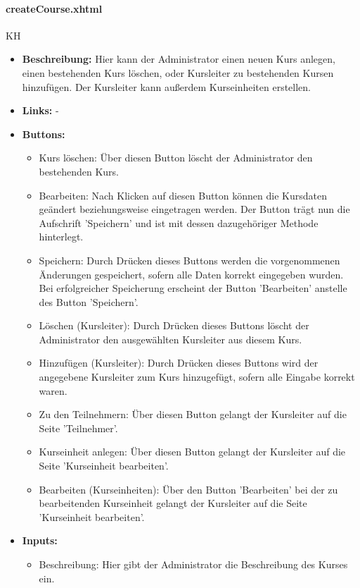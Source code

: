 				\paragraph{createCourse.xhtml}
					KH\\
					\begin{itemize}
						\item \textbf{Beschreibung:} Hier kann der Administrator einen neuen Kurs anlegen, einen bestehenden Kurs löschen, oder Kursleiter zu bestehenden Kursen hinzufügen. Der Kursleiter kann außerdem Kurseinheiten erstellen.
						\item \textbf{Links:} -
						\item \textbf{Buttons:}
							\begin{itemize}
								\item Kurs löschen: Über diesen Button löscht der Administrator den bestehenden Kurs.
								\item Bearbeiten: Nach Klicken auf diesen Button können die Kursdaten geändert beziehungsweise eingetragen werden. Der Button trägt nun die Aufschrift 'Speichern' und ist mit dessen dazugehöriger Methode hinterlegt.
								\item Speichern:  Durch Drücken dieses Buttons werden die vorgenommenen Änderungen gespeichert, sofern alle Daten korrekt eingegeben wurden. Bei erfolgreicher Speicherung erscheint der Button 'Bearbeiten' anstelle des Button 'Speichern'.
								\item Löschen (Kursleiter): Durch Drücken dieses Buttons löscht der Administrator den ausgewählten Kursleiter aus diesem Kurs. 
								\item Hinzufügen (Kursleiter): Durch Drücken dieses Buttons wird der angegebene Kursleiter zum Kurs hinzugefügt, sofern alle Eingabe korrekt waren.
								\item Zu den Teilnehmern: Über diesen Button gelangt der Kursleiter auf die Seite 'Teilnehmer'.
								\item Kurseinheit anlegen: Über diesen Button gelangt der Kursleiter auf die Seite 'Kurseinheit bearbeiten'.
								\item Bearbeiten (Kurseinheiten): Über den Button 'Bearbeiten' bei der zu bearbeitenden Kurseinheit gelangt der Kursleiter auf die Seite 'Kurseinheit bearbeiten'.
							\end{itemize}
						\item \textbf{Inputs:}
							\begin{itemize}
								\item Beschreibung: Hier gibt der Administrator die Beschreibung des Kurses ein.

\end{itemize}
\end{itemize}

